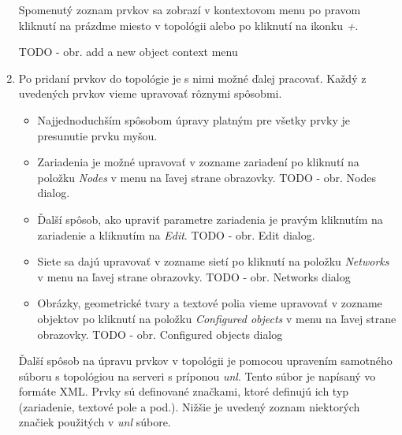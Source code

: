 \begin{enumerate}[noitemsep]
    Spomenutý zoznam prvkov sa zobrazí v kontextovom menu po pravom kliknutí na prázdme miesto v topológii alebo po kliknutí na ikonku \emph{+}.
    
{\huge TODO - obr. add a new object context menu}
    
    \item Po pridaní prvkov do topológie je s nimi možné ďalej pracovať. Každý z uvedených prvkov vieme upravovať rôznymi spôsobmi.
    
    \begin{itemize}[noitemsep]
        \item Najjednoduchším spôsobom úpravy platným pre všetky prvky je presunutie prvku myšou.
        \item Zariadenia je možné upravovať v zozname zariadení po kliknutí na položku \emph{Nodes} v menu na ľavej strane obrazovky. {\huge TODO - obr. Nodes dialog}.
        \item Ďalší spôsob, ako upraviť parametre zariadenia je pravým kliknutím na zariadenie a kliknutím na \emph{Edit}. {\huge TODO - obr. Edit dialog}.
        \item Siete sa dajú upravovať v zozname sietí po kliknutí na položku \emph{Networks} v menu na ľavej strane obrazovky. {\huge TODO - obr. Networks dialog}
        \item Obrázky, geometrické tvary a textové polia vieme upravovať v zozname objektov po kliknutí na položku \emph{Configured objects} v menu na ľavej strane obrazovky. {\huge TODO - obr. Configured objects dialog}
    \end{itemize}
    
Ďalší spôsob na úpravu prvkov v topológii je pomocou upravením samotného súboru s topológiou na serveri s príponou \emph{unl}. Tento súbor je napísaný vo formáte XML. Prvky sú definované značkami, ktoré definujú ich typ (zariadenie, textové pole a pod.). Nižšie je uvedený zoznam niektorých značiek použitých v \emph{unl} súbore.


\end{enumerate}
